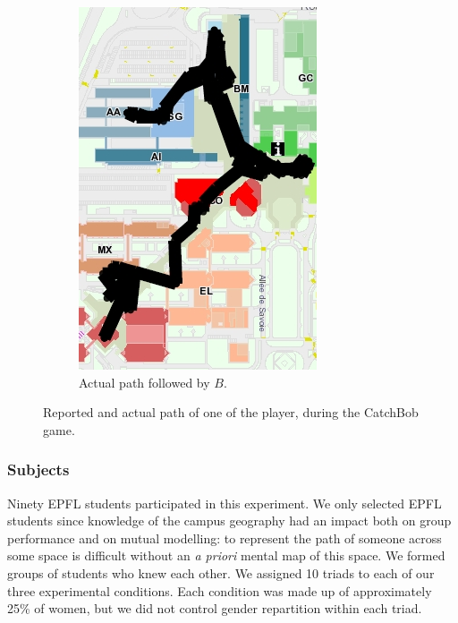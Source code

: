 \documentclass[natbib]{svjour3}
\begin{document}
\begin{figure}[h!t]
\begin{subfigure}{.3\textwidth}
            \includegraphics[width=\linewidth]{image7.png}
            \caption{Actual path followed by $B$.}
        \end{subfigure}
        \caption{Reported and actual path of one of the player, during the {\sc
        CatchBob} game.}
        \label{study2:paths}
\end{figure}

\subsubsection*{Subjects}

Ninety EPFL students participated in this experiment. We only selected EPFL
students since knowledge of the campus geography had an impact both on group
performance and on mutual modelling: to represent the path of someone across
some space is difficult without an \textit{a priori} mental map of this space.
We formed groups of students who knew each other. We assigned 10 triads to each
of our three experimental conditions. Each condition was made up of
approximately 25\% of women, but we did not control gender repartition within
each triad.
\end{document}
